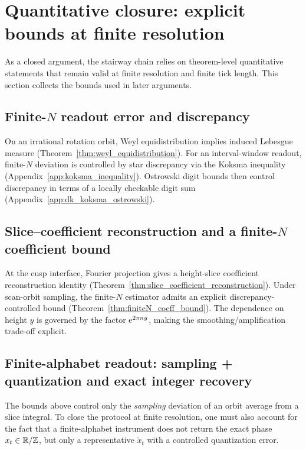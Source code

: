 
\section{Quantitative closure: explicit bounds at finite resolution}
\label{sec:quantitative_closure}

As a closed argument, the stairway chain relies on theorem-level quantitative statements that remain valid at finite resolution and finite tick length. This section collects the bounds used in later arguments.

\subsection{Finite-\texorpdfstring{$N$}{N} readout error and discrepancy}
On an irrational rotation orbit, Weyl equidistribution implies induced Lebesgue measure (Theorem~\ref{thm:weyl_equidistribution}). For an interval-window readout, finite-$N$ deviation is controlled by star discrepancy via the Koksma inequality (Appendix~\ref{app:koksma_inequality}). Ostrowski digit bounds then control discrepancy in terms of a locally checkable digit sum (Appendix~\ref{app:dk_koksma_ostrowski}).

\subsection{Slice--coefficient reconstruction and a finite-\texorpdfstring{$N$}{N} coefficient bound}
At the cusp interface, Fourier projection gives a height-slice coefficient reconstruction identity (Theorem~\ref{thm:slice_coefficient_reconstruction}). Under scan-orbit sampling, the finite-$N$ estimator admits an explicit discrepancy-controlled bound (Theorem~\ref{thm:finiteN_coeff_bound}). The dependence on height $y$ is governed by the factor $\mathrm{e}^{2\pi n y}$, making the smoothing/amplification trade-off explicit.

\subsection{Finite-alphabet readout: sampling + quantization and exact integer recovery}
The bounds above control only the \emph{sampling} deviation of an orbit average from a slice integral.
To close the protocol at finite resolution, one must also account for the fact that a finite-alphabet instrument does not return the exact phase $x_t\in\mathbb{R}/\mathbb{Z}$, but only a representative $\widetilde x_t$ with a controlled quantization error.

